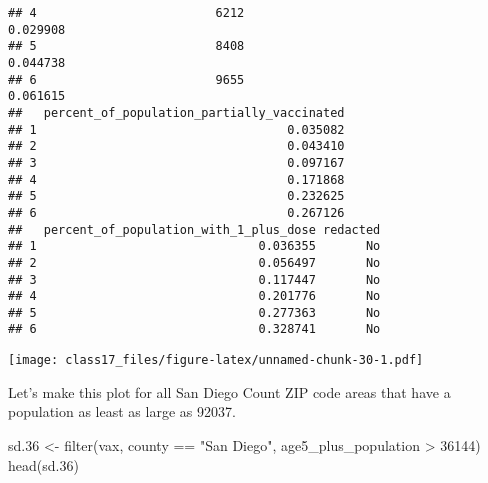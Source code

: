 \documentclass[
]{article}
\newenvironment{Shaded}{\begin{snugshade}}{\end{snugshade}}
\newcommand{\AttributeTok}[1]{\textcolor[rgb]{0.77,0.63,0.00}{#1}}
\newcommand{\DecValTok}[1]{\textcolor[rgb]{0.00,0.00,0.81}{#1}}
\newcommand{\FloatTok}[1]{\textcolor[rgb]{0.00,0.00,0.81}{#1}}
\newcommand{\FunctionTok}[1]{\textcolor[rgb]{0.00,0.00,0.00}{#1}}
\newcommand{\NormalTok}[1]{#1}
\newcommand{\OtherTok}[1]{\textcolor[rgb]{0.56,0.35,0.01}{#1}}
\newcommand{\SpecialCharTok}[1]{\textcolor[rgb]{0.00,0.00,0.00}{#1}}
\newcommand{\StringTok}[1]{\textcolor[rgb]{0.31,0.60,0.02}{#1}}
\begin{document}
\begin{verbatim}
## 4                         6212                               0.029908
## 5                         8408                               0.044738
## 6                         9655                               0.061615
##   percent_of_population_partially_vaccinated
## 1                                   0.035082
## 2                                   0.043410
## 3                                   0.097167
## 4                                   0.171868
## 5                                   0.232625
## 6                                   0.267126
##   percent_of_population_with_1_plus_dose redacted
## 1                               0.036355       No
## 2                               0.056497       No
## 3                               0.117447       No
## 4                               0.201776       No
## 5                               0.277363       No
## 6                               0.328741       No
\end{verbatim}

\begin{Shaded}
\end{Shaded}

\texttt{[image: class17\_files/figure-latex/unnamed-chunk-30-1.pdf]}

Let's make this plot for all San Diego Count ZIP code areas that have a
population as least as large as 92037.

\begin{Shaded}
\begin{Highlighting}[]
\NormalTok{sd}\FloatTok{.36} \OtherTok{\textless{}{-}} \FunctionTok{filter}\NormalTok{(vax, county }\SpecialCharTok{==} \StringTok{"San Diego"}\NormalTok{, }
\NormalTok{             age5\_plus\_population }\SpecialCharTok{\textgreater{}} \DecValTok{36144}\NormalTok{)}
\FunctionTok{head}\NormalTok{(sd}\FloatTok{.36}\NormalTok{)}
\end{Highlighting}
\end{Shaded}
\end{document}
